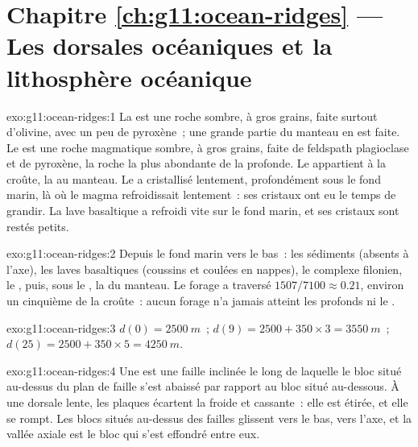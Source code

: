 \section*{Chapitre \ref{ch:g11:ocean-ridges} --- Les dorsales océaniques et la lithosphère océanique}

\begin{solution}{exo:g11:ocean-ridges:1}
La  est une roche sombre, à gros grains, faite surtout d'olivine,
avec un peu de pyroxène~; une grande partie du manteau en est faite. Le
 est une roche magmatique sombre, à gros grains, faite de feldspath
plagioclase et de pyroxène, la roche la plus abondante de la  profonde. Le  appartient à la croûte, la  au
manteau. Le  a cristallisé lentement, profondément sous le fond marin,
là où le magma refroidissait lentement~: ses cristaux ont eu le temps de
grandir. La lave basaltique a refroidi vite sur le fond marin, et ses
cristaux sont restés petits.
\end{solution}

\begin{solution}{exo:g11:ocean-ridges:2}
Depuis le fond marin vers le bas~: les sédiments (absents à l'axe), les
laves basaltiques (coussins et coulées en nappes), le complexe filonien, le
, puis, sous le , la  du manteau. Le forage a traversé
$1507/7100 \approx 0.21$, environ un cinquième de la croûte~: aucun forage
n'a jamais atteint les  profonds ni le .
\end{solution}

\begin{solution}{exo:g11:ocean-ridges:3}
$d(0) = \qty{2500}{m}$~; $d(9) = 2500 + 350 \times 3 = \qty{3550}{m}$~;
$d(25) = 2500 + 350 \times 5 = \qty{4250}{m}$.
\end{solution}

\begin{solution}{exo:g11:ocean-ridges:4}
Une  est une faille inclinée le long de laquelle le bloc situé
au-dessus du plan de faille s'est abaissé par rapport au bloc situé
au-dessous. À une dorsale lente, les plaques écartent la  froide
et cassante~: elle est étirée, et elle se rompt. Les blocs situés au-dessus
des failles glissent vers le bas, vers l'axe, et la vallée axiale est le
bloc qui s'est effondré entre eux.
\end{solution}

